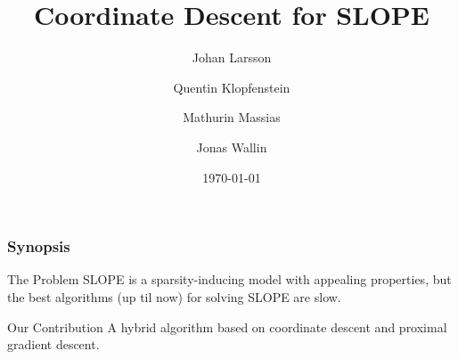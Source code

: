 



\title{Coordinate Descent for SLOPE}
\author[shortname]{\alert{Johan Larsson} \and Quentin Klopfenstein \and Mathurin Massias \and Jonas Wallin}
\date{\today}



\begin{frame}[c]
  \frametitle{Synopsis}

  \begin{block}{The Problem}
    SLOPE is a sparsity-inducing model with appealing properties, but the
    best algorithms (up til now) for solving SLOPE are slow.

    \begin{block}{Our Contribution}
      A hybrid algorithm based on coordinate descent and
      proximal gradient descent.
    \end{block}
  \end{block}

\end{frame}

